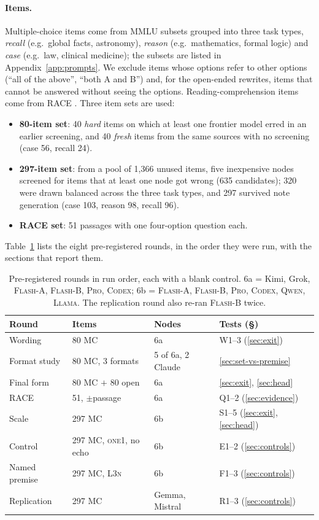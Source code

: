\documentclass[11pt]{article}
\begin{document}
\paragraph{Items.} Multiple-choice items come from MMLU \citep{hendrycks2021mmlu} subsets grouped into three task types, \emph{recall} (e.g.\ global facts, astronomy), \emph{reason} (e.g.\ mathematics, formal logic) and \emph{case} (e.g.\ law, clinical medicine); the subsets are listed in Appendix~\ref{app:prompts}. We exclude items whose options refer to other options (``all of the above'', ``both A and B'') and, for the open-ended rewrites, items that cannot be answered without seeing the options. Reading-comprehension items come from RACE \citep{lai2017race}. Three item sets are used:
\begin{itemize}\itemsep0pt
\item \textbf{80-item set}: 40 \emph{hard} items on which at least one frontier model erred in an earlier screening, and 40 \emph{fresh} items from the same sources with no screening (case 56, recall 24).
\item \textbf{297-item set}: from a pool of 1{,}366 unused items, five inexpensive nodes screened for items that at least one node got wrong (635 candidates); 320 were drawn balanced across the three task types, and 297 survived note generation (case 103, reason 98, recall 96).
\item \textbf{RACE set}: 51 passages with one four-option question each.
\end{itemize}
Table~\ref{tab:rounds} lists the eight pre-registered rounds, in the order they were run, with the sections that report them.

\begin{table}[t]
\centering\scriptsize
\setlength{\tabcolsep}{2.5pt}
\begin{tabular}{@{}llll@{}}
\toprule
Round & Items & Nodes & Tests (\S) \\
\midrule
Wording & 80 MC & 6a & W1--3 (\ref{sec:exit}) \\
Format study & 80 MC, 3 formats & 5 of 6a, 2 Claude & \ref{sec:set-vs-premise} \\
Final form & 80 MC $+$ 80 open & 6a & \ref{sec:exit}, \ref{sec:head} \\
RACE & 51, $\pm$passage & 6a & Q1--2 (\ref{sec:evidence}) \\
Scale & 297 MC & 6b & S1--5 (\ref{sec:exit}, \ref{sec:head}) \\
Control & 297 MC, \textsc{one1}, no echo & 6b & E1--2 (\ref{sec:controls}) \\
Named premise & 297 MC, \textsc{L3n} & 6b & F1--3 (\ref{sec:controls}) \\
Replication & 297 MC & Gemma, Mistral & R1--3 (\ref{sec:controls}) \\
\bottomrule
\end{tabular}
\caption{Pre-registered rounds in run order, each with a blank control. 6a = Kimi, Grok, \textsc{Flash-A}, \textsc{Flash-B}, \textsc{Pro}, \textsc{Codex}; 6b = \textsc{Flash-A}, \textsc{Flash-B}, \textsc{Pro}, \textsc{Codex}, \textsc{Qwen}, \textsc{Llama}. The replication round also re-ran \textsc{Flash-B} twice.}
\label{tab:rounds}
\end{table}
\end{document}

